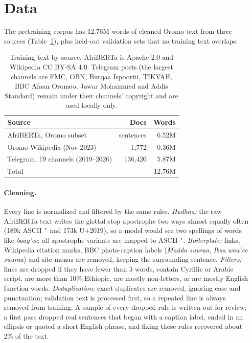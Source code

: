 \documentclass[11pt]{article}
\newcommand{\om}[1]{\textit{#1}}
\begin{document}
\section{Data}
\label{sec:data}

The pretraining corpus has 12.76M words of cleaned Oromo text from three sources (Table~\ref{tab:data}), plus held-out validation sets that no training text overlaps.

\begin{table}[t]
\centering
\small
\begin{tabular}{@{}lrr@{}}
\toprule
Source & Docs & Words \\
\midrule
AfriBERTa, Oromo subset & sentences & 6.52M \\
Oromo Wikipedia (Nov 2023) & 1,772 & 0.36M \\
Telegram, 19 channels (2019--2026) & 136,420 & 5.87M \\
\midrule
Total & & 12.76M \\
\bottomrule
\end{tabular}
\caption{Training text by source. AfriBERTa is Apache-2.0 and Wikipedia CC BY-SA 4.0. Telegram posts (the largest channels are FMC, OBN, Burqaa Ispoortii, TIKVAH, BBC Afaan Oromoo, Jawar Mohammed and Addis Standard) remain under their channels' copyright and are used locally only.}
\label{tab:data}
\end{table}

\paragraph{Cleaning.} Every line is normalized and filtered by the same rules. \emph{Hudhaa:} the raw AfriBERTa text writes the glottal-stop apostrophe two ways almost equally often (189k ASCII \texttt{'} and 173k U+2019), so a model would see two spellings of words like \om{baay'ee}; all apostrophe variants are mapped to ASCII \texttt{'}. \emph{Boilerplate:} links, Wikipedia citation marks, BBC photo-caption labels (\om{Madda suuraa}, \om{Ibsa waa'ee suuraa}) and site menus are removed, keeping the surrounding sentence. \emph{Filters:} lines are dropped if they have fewer than 3 words, contain Cyrillic or Arabic script, are more than 10\% Ethiopic, are mostly non-letters, or are mostly English function words. \emph{Deduplication:} exact duplicates are removed, ignoring case and punctuation; validation text is processed first, so a repeated line is always removed from training. A sample of every dropped rule is written out for review; a first pass dropped real sentences that began with a caption label, ended in an ellipsis or quoted a short English phrase, and fixing these rules recovered about 2\% of the text.
\end{document}
